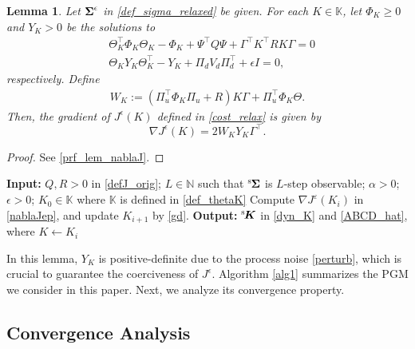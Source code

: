\documentclass[preprint,5p,times,twocolumn]{elsarticle}
\newcommand{\bm}[1]{{\mbox{\boldmath $#1$}}}
\newtheorem{lem}{Lemma}
\def\rms{{}^{\rm s}\hspace{-0.2mm}}
\def\rmsK{{}^{\rm s}\hspace{-0.4mm}}
\begin{document}
\begin{lem} \label{lem_nablaJ}
Let ${\bm \Sigma}^{\epsilon}$ in \eqref{def_sigma_relaxed} be given. For each $K \in \mathbb K$, let $\Phi_K \geq 0$ and $Y_K > 0$ be the solutions to
\begin{align}
    &\Theta_K^{\top} \Phi_K \Theta_K - \Phi_K + \Psi^{\top}Q\Psi  + \Gamma^{\top}K^{\top}RK\Gamma = 0 \label{lyap} \\
    &\Theta_K Y_K \Theta^{\top}_K - Y_K + \Pi_d V_d \Pi_d^{\top} + {\epsilon}I = 0, \label{EKH2}
\end{align}
respectively. Define 
\begin{align}\label{EKH1}
 W_{K}:= (\Pi_u^{\top}\Phi_K\Pi_u + R)K\Gamma+\Pi_u^{\top}\Phi_K\Theta. 
\end{align}
Then, the gradient of $J^{\epsilon}(K)$ defined in \eqref{cost_relax} is given by
\begin{equation}\label{nablaJep}
\nabla J^{\epsilon}(K)=2W_K Y_{K}\Gamma^{\top}.  
\end{equation}
\end{lem}
\begin{proof}
See \ref{prf_lem_nablaJ}. 
\end{proof}

\begin{algorithm}[t]
\caption{PGM for the relaxed LQG problem}\label{alg1}
\begin{algorithmic}[1]
\STATE \textbf{Input:} $Q,R>0$ in \eqref{defJ_orig}; $L \in \mathbb N$ such that $\rms {\bm \Sigma}$ is $L$-step observable; $\alpha>0$; $\epsilon>0$; $K_0 \in \mathbb K$ where $\mathbb K$ is defined in \eqref{def_thetaK}
    \STATE Compute $\nabla J^{\varepsilon}(K_i)$ in \eqref{nablaJep}, and update $K_{i+1}$ by \eqref{gd}. 
\ENDFOR
\STATE \textbf{Output:} $\rmsK {\bm K}$ in \eqref{dyn_K} and \eqref{ABCD_hat}, where $K \leftarrow K_i$
\end{algorithmic}
\end{algorithm}

In this lemma, $Y_K$ is positive-definite due to the process noise \eqref{perturb}, which is crucial to guarantee the coerciveness of $J^{\epsilon}$. 
Algorithm \ref{alg1} summarizes the PGM we consider in this paper. Next, we analyze its convergence property.


\subsection{Convergence Analysis}
\end{document}
